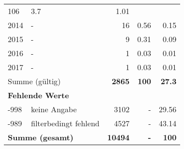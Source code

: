\begin{longtable}{lXrrr}
       \num{106} &
       \num[round-mode=places,round-precision=2]{3.7} &
         \num[round-mode=places,round-precision=2]{1.01} \\

     2014 &
     \multicolumn{1}{X}{ -  } &


       \num{16} &
       \num[round-mode=places,round-precision=2]{0.56} &
         \num[round-mode=places,round-precision=2]{0.15} \\

     2015 &
     \multicolumn{1}{X}{ -  } &


       \num{9} &
       \num[round-mode=places,round-precision=2]{0.31} &
         \num[round-mode=places,round-precision=2]{0.09} \\

     2016 &
     \multicolumn{1}{X}{ -  } &


       \num{1} &
       \num[round-mode=places,round-precision=2]{0.03} &
         \num[round-mode=places,round-precision=2]{0.01} \\

     2017 &
     \multicolumn{1}{X}{ -  } &


       \num{1} &
       \num[round-mode=places,round-precision=2]{0.03} &
         \num[round-mode=places,round-precision=2]{0.01} \\
     \midrule
     \multicolumn{2}{l}{Summe (gültig)} &
       \textbf{\num{2865}} &
     \textbf{\num{100}} &
       \textbf{\num[round-mode=places,round-precision=2]{27.3}} \\
     \multicolumn{5}{l}{\textbf{Fehlende Werte}}\\
       -998 &
       keine Angabe &
         \num{3102} &
        - &
         \num[round-mode=places,round-precision=2]{29.56} \\
       -989 &
       filterbedingt fehlend &
         \num{4527} &
        - &
         \num[round-mode=places,round-precision=2]{43.14} \\
     \midrule
     \multicolumn{2}{l}{\textbf{Summe (gesamt)}} &
          \textbf{\num{10494}} &
        \textbf{-} &
        \textbf{\num{100}} \\
     \bottomrule
     \end{longtable}
     

